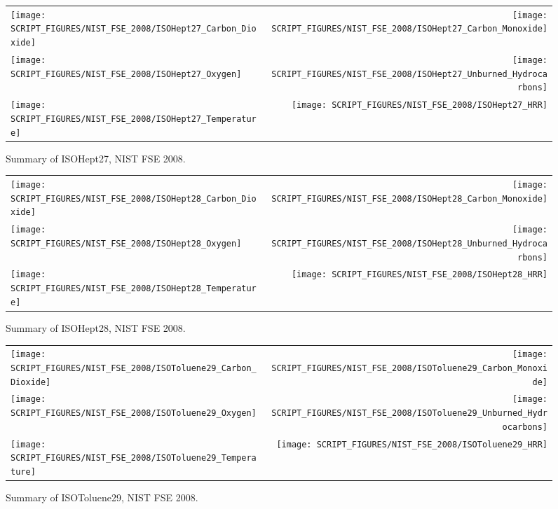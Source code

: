 \begin{figure}[p]
\begin{tabular*}{\textwidth}{l@{\extracolsep{\fill}}r}
\texttt{[image: SCRIPT\_FIGURES/NIST\_FSE\_2008/ISOHept27\_Carbon\_Dioxide]} &
\texttt{[image: SCRIPT\_FIGURES/NIST\_FSE\_2008/ISOHept27\_Carbon\_Monoxide]} \\
\texttt{[image: SCRIPT\_FIGURES/NIST\_FSE\_2008/ISOHept27\_Oxygen]} &
\texttt{[image: SCRIPT\_FIGURES/NIST\_FSE\_2008/ISOHept27\_Unburned\_Hydrocarbons]} \\
\texttt{[image: SCRIPT\_FIGURES/NIST\_FSE\_2008/ISOHept27\_Temperature]} &
\texttt{[image: SCRIPT\_FIGURES/NIST\_FSE\_2008/ISOHept27\_HRR]}
\end{tabular*}
\caption[Summary of ISOHept27, NIST FSE 2008]{Summary of ISOHept27, NIST FSE 2008.}
\label{NIST_FSE_1994_ISOHept27}
\end{figure}

\begin{figure}[p]
\begin{tabular*}{\textwidth}{l@{\extracolsep{\fill}}r}
\texttt{[image: SCRIPT\_FIGURES/NIST\_FSE\_2008/ISOHept28\_Carbon\_Dioxide]} &
\texttt{[image: SCRIPT\_FIGURES/NIST\_FSE\_2008/ISOHept28\_Carbon\_Monoxide]} \\
\texttt{[image: SCRIPT\_FIGURES/NIST\_FSE\_2008/ISOHept28\_Oxygen]} &
\texttt{[image: SCRIPT\_FIGURES/NIST\_FSE\_2008/ISOHept28\_Unburned\_Hydrocarbons]} \\
\texttt{[image: SCRIPT\_FIGURES/NIST\_FSE\_2008/ISOHept28\_Temperature]} &
\texttt{[image: SCRIPT\_FIGURES/NIST\_FSE\_2008/ISOHept28\_HRR]}
\end{tabular*}
\caption[Summary of ISOHept28, NIST FSE 2008]{Summary of ISOHept28, NIST FSE 2008.}
\label{NIST_FSE_1994_ISOHept28}
\end{figure}

\begin{figure}[p]
\begin{tabular*}{\textwidth}{l@{\extracolsep{\fill}}r}
\texttt{[image: SCRIPT\_FIGURES/NIST\_FSE\_2008/ISOToluene29\_Carbon\_Dioxide]} &
\texttt{[image: SCRIPT\_FIGURES/NIST\_FSE\_2008/ISOToluene29\_Carbon\_Monoxide]} \\
\texttt{[image: SCRIPT\_FIGURES/NIST\_FSE\_2008/ISOToluene29\_Oxygen]} &
\texttt{[image: SCRIPT\_FIGURES/NIST\_FSE\_2008/ISOToluene29\_Unburned\_Hydrocarbons]} \\
\texttt{[image: SCRIPT\_FIGURES/NIST\_FSE\_2008/ISOToluene29\_Temperature]} &
\texttt{[image: SCRIPT\_FIGURES/NIST\_FSE\_2008/ISOToluene29\_HRR]}
\end{tabular*}
\caption[Summary of ISOToluene29, NIST FSE 2008]{Summary of ISOToluene29, NIST FSE 2008.}
\label{NIST_FSE_1994_ISOToluene29}
\end{figure}

